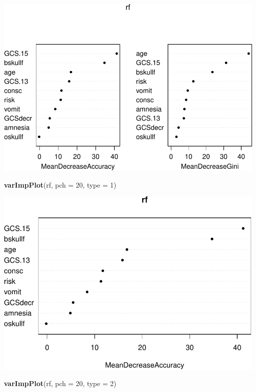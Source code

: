 \documentclass[]{article}
\newenvironment{Shaded}{\begin{snugshade}}{\end{snugshade}}
\newcommand{\DataTypeTok}[1]{\textcolor[rgb]{0.13,0.29,0.53}{#1}}
\newcommand{\DecValTok}[1]{\textcolor[rgb]{0.00,0.00,0.81}{#1}}
\newcommand{\KeywordTok}[1]{\textcolor[rgb]{0.13,0.29,0.53}{\textbf{#1}}}
\newcommand{\NormalTok}[1]{#1}
\begin{document}
\includegraphics{8Trees_files/figure-latex/unnamed-chunk-35-1.pdf}

\begin{Shaded}
\begin{Highlighting}[]
\KeywordTok{varImpPlot}\NormalTok{(rf, }\DataTypeTok{pch =} \DecValTok{20}\NormalTok{, }\DataTypeTok{type =} \DecValTok{1}\NormalTok{)}
\end{Highlighting}
\end{Shaded}

\includegraphics{8Trees_files/figure-latex/unnamed-chunk-35-2.pdf}

\begin{Shaded}
\begin{Highlighting}[]
\KeywordTok{varImpPlot}\NormalTok{(rf, }\DataTypeTok{pch =} \DecValTok{20}\NormalTok{, }\DataTypeTok{type =} \DecValTok{2}\NormalTok{)}
\end{Highlighting}
\end{Shaded}
\end{document}
